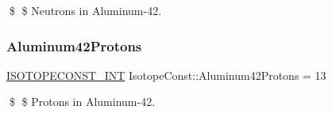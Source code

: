 \$ \$ Neutrons in Aluminum-\/42. \mbox{\label{group___isotope_const-_aluminum-_al42_ga4abc71b8df73ca7f1b5c582b3d242ed6}} 
\subsubsection{\texorpdfstring{Aluminum42\+Protons}{Aluminum42Protons}}
{\footnotesize\ttfamily \mbox{\hyperlink{group___isotope_const-_macros_ga5f18360b3e99483a35c32d789e62621c}{I\+S\+O\+T\+O\+P\+E\+C\+O\+N\+S\+T\+\_\+\+I\+NT}} Isotope\+Const\+::\+Aluminum42\+Protons = 13}

\$ \$ Protons in Aluminum-\/42. 